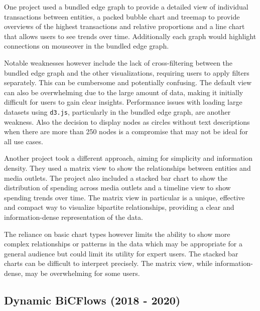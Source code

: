 \documentclass{vgtc}                          %
\begin{document}
\medskip

One project \cite{univie03} used a bundled edge graph to provide a detailed view of individual transactions between entities, a packed bubble chart and treemap to provide overviews of the highest transactions and relative proportions and a line chart that allows users to see trends over time. Additionally each graph would highlight connections on mouseover in the bundled edge graph.

Notable weaknesses however include the lack of cross-filtering between the bundled edge graph and the other visualizations, requiring users to apply filters separately. This can be cumbersome and potentially confusing. The default view can also be overwhelming due to the large amount of data, making it initially difficult for users to gain clear insights. Performance issues with loading large datasets using \texttt{d3.js}, particularly in the bundled edge graph, are another weakness. Also the decision to display nodes as circles without text descriptions when there are more than 250 nodes is a compromise that may not be ideal for all use cases.

\medskip

Another project \cite{univie07} took a different approach, aiming for simplicity and information density. 
They used a matrix view to show the relationships between entities and media outlets. The project also included a stacked bar chart to show the distribution of spending across media outlets and a timeline view to show spending trends over time. The matrix view in particular is a unique, effective and compact way to visualize bipartite relationships, providing a clear and information-dense representation of the data.

The reliance on basic chart types however limits the ability to show more complex relationships or patterns in the data which may be appropriate for a general audience but could limit its utility for expert users. The stacked bar charts can be difficult to interpret precisely. The matrix view, while information-dense, may be overwhelming for some users.

\subsection{Dynamic BiCFlows (2018 - 2020)}





\cite{Steinbck2018CasualVE}
\end{document}
